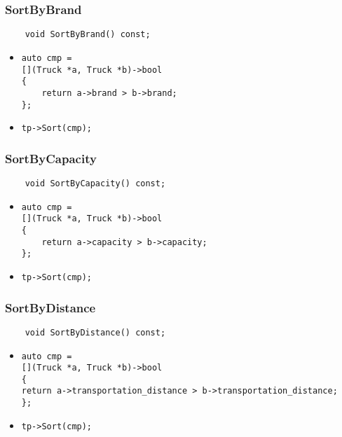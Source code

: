 \subsubsection*{SortByBrand}

\begin{lstlisting}
    void SortByBrand() const;
\end{lstlisting}

\begin{itemize}
	\item \verb|auto cmp =|\\
    \verb|[](Truck *a, Truck *b)->bool|\\
    \verb|{|\\
	\verb|    return a->brand > b->brand;|\\
    \verb|};|
    \item \verb|tp->Sort(cmp);|
\end{itemize}



\subsubsection*{SortByCapacity}

\begin{lstlisting}
    void SortByCapacity() const;
\end{lstlisting}

\begin{itemize}
	\item \verb|auto cmp =|\\
    \verb|[](Truck *a, Truck *b)->bool|\\
    \verb|{|\\
	\verb|    return a->capacity > b->capacity;|\\
    \verb|};|
    \item \verb|tp->Sort(cmp);|
\end{itemize}



\subsubsection*{SortByDistance}

\begin{lstlisting}
    void SortByDistance() const;
\end{lstlisting}

\begin{itemize}
	\item \verb|auto cmp =|\\
    \verb|[](Truck *a, Truck *b)->bool|\\
    \verb|{|\\
	\verb|return a->transportation_distance > b->transportation_distance;|\\
    \verb|};|
    \item \verb|tp->Sort(cmp);|
\end{itemize}



